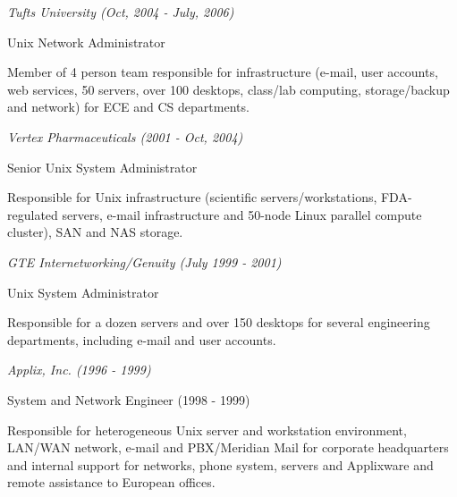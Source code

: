 \documentclass[11pt,article,oneside]{memoir}
\begin{document}
\vspace{-0.075in}

\normalsize

\bigskip
\noindent\emph{Tufts University (Oct, 2004 - July, 2006) \vspace{0.05in}}

\ind \footnotesize Unix Network Administrator

\ind \hspace{0.35in} \footnotesize Member of 4 person team responsible for infrastructure (e-mail, user accounts, web services, 50 servers, over 100 desktops, class/lab computing, storage/backup and network) for ECE and CS departments.

\vspace{-0.075in}

\normalsize

\bigskip
\noindent\emph{Vertex Pharmaceuticals (2001 - Oct, 2004) \vspace{0.05in}}

\ind \footnotesize Senior Unix System Administrator

\ind \hspace{0.35in} \footnotesize Responsible for Unix infrastructure (scientific servers/workstations, FDA-regulated servers, e-mail infrastructure and 50-node Linux parallel compute cluster), SAN and NAS storage.

\vspace{-0.075in}

\normalsize

\bigskip
\noindent\emph{GTE Internetworking/Genuity (July 1999 - 2001)}

\ind \footnotesize Unix System Administrator

\ind \hspace{0.35in} \footnotesize Responsible for a dozen servers and over 150 desktops for several engineering departments, including e-mail and user accounts.

\vspace{-0.075in}

\normalsize

\bigskip
\noindent\emph{Applix, Inc. (1996 - 1999)}

\ind \footnotesize System and Network Engineer (1998 - 1999)

\ind \hspace{0.35in} \footnotesize Responsible for heterogeneous Unix server and workstation environment, LAN/WAN network, e-mail and PBX/Meridian Mail for
corporate headquarters and internal support for networks, phone system, servers and Applixware and remote assistance to European offices.
\end{document}
